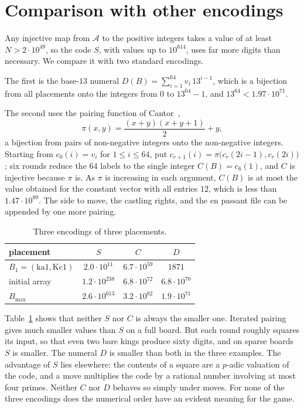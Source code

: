 \documentclass[12pt,reqno]{article}
\newcommand{\adm}{\mathcal{A}}
\newcommand{\sq}[1]{\mathrm{#1}}
\begin{document}
\section{Comparison with other encodings}\label{secother}

Any injective map from $\adm$ to the positive integers takes a value of at least
$N>2\cdot 10^{49}$, so the code $S$, with values up to $10^{614}$, uses far more digits than necessary. We
compare it with two standard encodings.

The first is the base-$13$ numeral $D(B)=\sum_{i=1}^{64}v_i\,13^{i-1}$, which is a bijection from
all placements onto the integers from $0$ to $13^{64}-1$, and $13^{64}<1.97\cdot 10^{71}$.

The second uses the pairing function of Cantor~\cite{cantor},
\begin{displaymath}
\pi(x,y)=\frac{(x+y)(x+y+1)}{2}+y,
\end{displaymath}
a bijection from pairs of non-negative integers onto the non-negative integers. Starting from
$c_0(i)=v_i$ for $1\leq i\leq 64$, put $c_{r+1}(i)=\pi\bigl(c_r(2i-1),c_r(2i)\bigr)$; six rounds
reduce the $64$ labels to the single integer $C(B)=c_6(1)$, and $C$ is injective because $\pi$
is. As $\pi$ is increasing in each argument, $C(B)$ is at most the value obtained for the
constant vector with all entries $12$, which is less than $1.47\cdot 10^{89}$. The side to move,
the castling rights, and the en passant file can be appended by one more pairing.

\begin{table}[H]
\begin{center}
\begin{tabular}{l|c|c|c}
placement & $S$ & $C$ & $D$\\ \hline
$B_1=(\sq{ka1},\sq{Kc1})$ & $2.0\cdot 10^{11}$ & $6.7\cdot 10^{59}$ & $1871$\\
initial array & $1.2\cdot 10^{238}$ & $6.8\cdot 10^{72}$ & $6.8\cdot 10^{70}$\\
$B_{\max}$ & $2.6\cdot 10^{613}$ & $3.2\cdot 10^{82}$ & $1.9\cdot 10^{71}$
\end{tabular}
\end{center}
\caption{Three encodings of three placements.}
\label{tabcompare}
\end{table}

Table~\ref{tabcompare} shows that neither $S$ nor $C$ is always the smaller one. Iterated pairing
gives much smaller values than $S$ on a full board. But each round roughly squares its input, so
that even two bare kings produce sixty digits, and on sparse boards $S$ is smaller. The numeral
$D$ is smaller than both in the three examples. The advantage of $S$ lies elsewhere: the contents
of a square are a $p$-adic valuation of the code, and a move multiplies the code by a rational
number involving at most four primes. Neither $C$ nor $D$ behaves so simply under moves. For
none of the three encodings does the numerical order have an evident meaning for the game.
\end{document}
